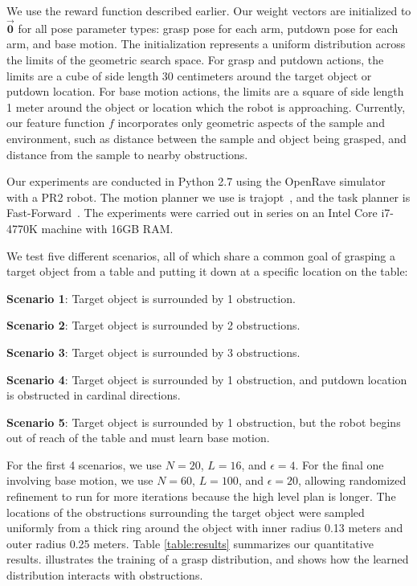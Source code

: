 We use the reward function described earlier. Our weight
vectors are initialized to $\vec{\mathbf{0}}$ for all pose parameter types: grasp pose
for each arm, putdown pose for each arm, and base motion.
The initialization represents a uniform distribution across the limits of the geometric search space.
For grasp and putdown actions, the limits are a cube of side length 30 centimeters
around the target object or putdown location. For base motion actions, the limits are a
square of side length 1 meter around the object or location which the robot is approaching.
Currently, our feature function $f$ incorporates only geometric aspects of the sample and environment,
such as distance between the sample and object being grasped, and distance from the sample to
nearby obstructions.

Our experiments are conducted in Python 2.7 using the OpenRave simulator~\cite{Diankov_2008_6117} with a PR2 robot.
The motion planner we use is trajopt~\cite{schulman2013finding}, and the task planner is Fast-Forward~\cite{FF}.
The experiments were carried out in series on an Intel Core i7-4770K machine
with 16GB RAM.

We test five different scenarios, all of which share a common goal of
grasping a target object from a table and putting it down at a specific location on the table:
\begin{tightlist}
\item[\textbf{Scenario 1}:] Target object is surrounded by 1 obstruction.
\item[\textbf{Scenario 2}:] Target object is surrounded by 2 obstructions.
\item[\textbf{Scenario 3}:] Target object is surrounded by 3 obstructions.
\item[\textbf{Scenario 4}:] Target object is surrounded by 1 obstruction,
and putdown location is obstructed in cardinal directions.
\item[\textbf{Scenario 5}:] Target object is surrounded by 1 obstruction,
but the robot begins out of reach of the table and must learn base motion.
\end{tightlist}

For the first 4 scenarios, we use $N = 20$, $L = 16$, and $\epsilon = 4$.
For the final one involving base motion, we use $N = 60$, $L = 100$, and $\epsilon = 20$,
allowing randomized refinement to run for more iterations because the high level plan
is longer. The locations of the obstructions surrounding the target object were
sampled uniformly from a thick ring around the object with inner radius 0.13 meters
and outer radius 0.25 meters. Table \ref{table:results} summarizes our quantitative results.
 illustrates the training of a grasp distribution, and 
shows how the learned distribution interacts with obstructions.

